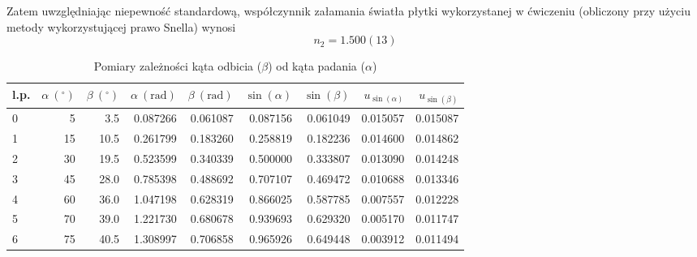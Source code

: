 \documentclass[a4paper]{article}
\begin{document}
Zatem uwzględniając niepewność standardową, współczynnik załamania światła płytki wykorzystanej w ćwiczeniu (obliczony przy użyciu metody wykorzystującej prawo Snella) wynosi \[ n_2 = 1.500(13)\]
\begin{table}
\centering
\begin{tabular}{lrrrrrrrr}
\toprule

l.p.&  $\alpha \ ({}^\circ)$ & $\beta \ ({}^\circ)$ &  $\alpha \ (\text{rad})$ &  $\beta \ (\text{rad})$ &  $\sin(\alpha)$ &  $\sin(\beta)$ &  $u_{\sin(\alpha)}$ &  $u_{\sin(\beta)}$ \\
\midrule
0  &           5 &         3.5& 0.087266 &    0.061087 &   0.087156 &   0.061049 &              0.015057 &              0.015087 \\
1  &          15 &        10.5 & 0.261799 &    0.183260 &   0.258819 &   0.182236 &              0.014600 &              0.014862 \\
2 & 30 & 19.5 &0.523599 &    0.340339 &   0.500000 &   0.333807 &              0.013090 &              0.014248 \\
3&          45 &        28.0 & 0.785398 &    0.488692 &   0.707107 &   0.469472 &              0.010688 &              0.013346 \\
4&          60 &        36.0 & 1.047198 &    0.628319 &   0.866025 &   0.587785 &              0.007557 &              0.012228 \\
5  &          70 &        39.0& 1.221730 &    0.680678 &   0.939693 &   0.629320 &              0.005170 &              0.011747 \\
6 &          75 &        40.5& 1.308997 &    0.706858 &   0.965926 &   0.649448 &              0.003912 &              0.011494 \\
\bottomrule
\end{tabular}

\caption{Pomiary zależności kąta odbicia ($\beta$) od kąta padania ($\alpha$)}
\label{snell-pomiary}
\end{table}
\end{document}
